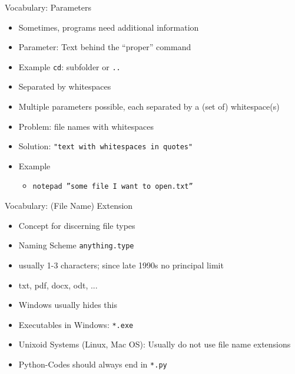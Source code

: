 
\begin{frame}{Vocabulary: Parameters}
%
\begin{itemize}
\item Sometimes, programs need additional information
\item Parameter: Text behind the \enquote{proper} command
\item Example \texttt{cd}: subfolder or \texttt{..}
\item Separated by whitespaces
\item Multiple parameters possible, each separated by a (set of) whitespace(s)
\item Problem: file names with whitespaces
\item Solution: \texttt{"text with whitespaces in quotes"}
\item Example
	\begin{itemize}
	\item \texttt{notepad ''some file I want to open.txt''}
	\end{itemize}
\end{itemize}
%
\end{frame}


\begin{frame}{Vocabulary: (File Name) Extension}
%
\begin{itemize}
\item Concept for discerning file types
\item Naming Scheme \texttt{anything.type}
\item usually 1-3 characters; since late 1990s no principal limit
\item txt, pdf, docx, odt, ...
\item Windows usually hides this
\item Executables in Windows: \texttt{*.exe}
\item Unixoid Systems (Linux, Mac OS): Usually do not use file name extensions
\item Python-Codes should always end in \texttt{*.py}
\end{itemize}
%
\end{frame}



